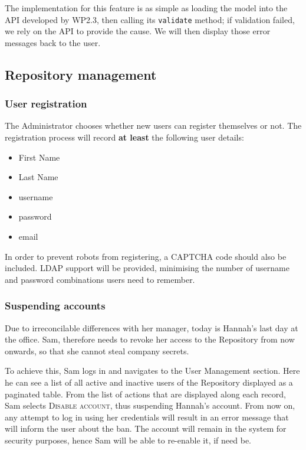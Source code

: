 \begin{techNote}
The implementation for this feature is as simple as loading the model into the API developed by WP2.3, then calling its \texttt{validate} method; if validation failed, we rely on the API to provide the cause. We will then display those error messages back to the user.
\end{techNote}

\subsection{Repository management} 

\subsubsection{User registration}
The Administrator chooses whether new users can register themselves or not. The registration process will record \textbf{at least} the following user details:
\begin{itemize}
\item First Name
\item Last Name
\item username
\item password
\item email
\end{itemize}


\begin{techNote}
In order to prevent robots from registering, a CAPTCHA code should also be included. LDAP support will be provided, minimising the number of username and password combinations users need to remember. 
\end{techNote}


\subsubsection{Suspending accounts}
Due to irreconcilable differences with her manager, today is Hannah's last day at the office. Sam, therefore needs to revoke her access to the Repository from now onwards, so that she cannot steal company secrets. 

To achieve this, Sam logs in and navigates to the User Management section. Here he can see a list of all active and inactive users of the Repository displayed as a paginated table. From the list of actions that are displayed along each record, Sam selects \textsc{Disable account}, thus suspending Hannah's account. From now on, any attempt to log in using her credentials will result in an error message that will inform the user about the ban. The account will remain in the system for security purposes, hence Sam will be able to re-enable it, if need be.

